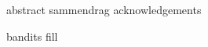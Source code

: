 \documentclass[
    11pt,
    twoside,
    openright,
]{report} %
\begin{document}

{abstract}
{sammendrag}
{acknowledgements}


\setcounter{tocdepth}{2}
\tableofcontents
\cleardoublepage


{bandits}
{fill}
\end{document}
